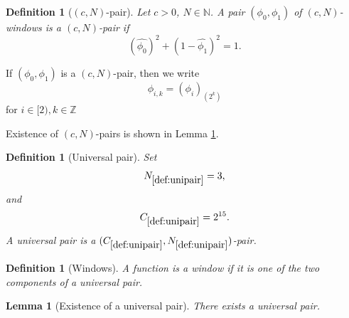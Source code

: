 \documentclass[12pt,reqno]{amsart}
\theoremstyle{plain}
\newtheorem{lemma}[theorem]{Lemma}
\newtheorem{definition}[theorem]{Definition}
\numberwithin{equation}{section}
\theoremstyle{remark}
\newcommand{\uses}[1]{}
\newcommand{\usesdefs}[1]{}
\begin{document}
\begin{definition}[$(c,N)$-pair]
\label{def:cpair}\uses{}\usesdefs{def:cn-window}
Let $c > 0$, $N\in\mathbb{N}$.  A pair $(\phi_0,\phi_1)$ of $(c,N)$-windows is a {\em $(c,N)$-pair} if
\begin{equation}\label{windowsum}
(\widehat{\phi_0})^2+(1-\widehat{\phi_1})^2=1.
\end{equation}
\end{definition}
If $(\phi_0,\phi_1)$ is a $(c,N)$-pair, then we write
\begin{equation}\label{auto:rescaled-window-notation}\phi_{i,k}=(\phi_i)_{(2^{k})}\end{equation}
for $i\in [2), k\in\mathbb{Z}$

Existence of $(c,N)$-pairs is shown in Lemma \ref{lem:cpair}.

\begin{definition}[Universal pair]\label{def:unipair}\uses{}\usesdefs{def:cpair}
Set
\begin{equation}\label{universal pair parameters}
N_{\ref{def:unipair}}=3,
\end{equation}
and
\begin{equation}\label{auto:universal-window-constant}
C_{\ref{def:unipair}}=2^{15}.
\end{equation}
A universal pair is a $(C_{\ref{def:unipair}},N_{\ref{def:unipair}})$-pair.
\end{definition}

\begin{definition}[Windows]\label{def:window}\uses{}\usesdefs{def:unipair}
A function is a window if it is one of the two components of a universal pair.
\end{definition}

\begin{lemma}[Existence of a universal pair]\label{lem:cpair}\uses{standard bump properties}\usesdefs{standard bump,def:cn-window,def:cpair,def:unipair}
There exists a universal pair.
\end{lemma}
\end{document}

